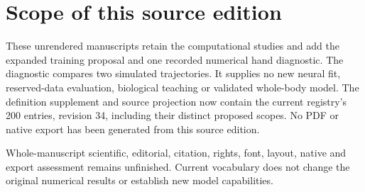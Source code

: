 \section*{Scope of this source edition}
These unrendered manuscripts retain the computational studies and add the
expanded training proposal and one recorded numerical hand diagnostic. The
diagnostic compares two simulated trajectories. It supplies no new neural fit,
reserved-data evaluation, biological teaching or validated whole-body model.
The definition supplement and source projection now contain the current
registry's 200 entries, revision 34, including their distinct proposed scopes.
No PDF or native export has been generated from this source edition.

Whole-manuscript scientific, editorial, citation, rights, font, layout, native
and export assessment remains unfinished. Current vocabulary does not change
the original numerical results or establish new model capabilities.
